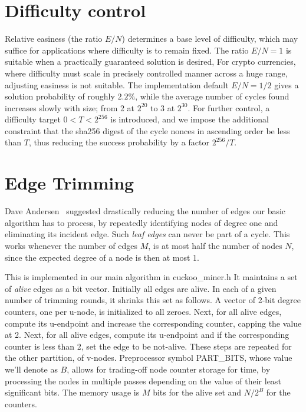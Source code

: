 \documentclass[11pt, oneside]{article}
\begin{document}
\section{Difficulty control}
Relative easiness (the ratio $E/N$) determines a base level of difficulty,
which may suffice for applications where difficulty is to remain fixed.
The ratio $E/N=1$ is suitable when a practically guaranteed solution is desired,
For crypto currencies, where difficulty must scale in precisely
controlled manner across a huge range, adjusting easiness is not suitable.
The implementation default $E/N=1/2$ gives a solution probability of roughly $2.2\%$,
while the average number of cycles found increases slowly with size; from 2 at $2^{20}$
to 3 at $2^{30}$.
For further control, a difficulty target $0 < T < 2^{256}$ is introduced,
and we impose the additional constraint that the sha256 digest of the
cycle nonces in ascending order be less than $T$, thus
reducing the success probability by a factor $2^{256}/T$.

\section{Edge Trimming}
Dave Andersen~\cite{dga2014} suggested drastically reducing the number of edges
our basic algorithm has to process, by repeatedly identifying nodes of degree one
and eliminating its incident edge. Such {\em leaf edges} can never be part of a cycle.
This works whenever the number of edges $M$, is at most half the number of nodes $N$,
since the expected degree of a node is then at most 1.

This is implemented in our main algorithm in cuckoo\_miner.h
It maintains a set of {\em alive} edges as a bit vector. Initially all edges are alive.
In each of a given number of trimming rounds, it shrinks this set as follows.
A vector of 2-bit degree counters, one per u-node, is initialized to all zeroes.
Next, for all alive edges, compute its u-endpoint and increase the corresponding counter,
capping the value at 2.
Next, for all alive edges, compute its u-endpoint and if the corresponding counter is less than 2,
set the edge to be not-alive.
These steps are repeated for the other partition, of v-nodes.
Preprocessor symbol PART\_BITS, whose value we'll denote as $B$,
allows for trading-off node counter storage for time,
by processing the nodes in multiple passes depending on the value of their least significant bits.
The memory usage is $M$ bits for the alive set and $N / 2^{B}$ for the counters.
\end{document}
